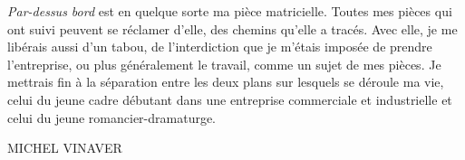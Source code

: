 \documentclass[a4paper]{report}
\begin{document}
\textit{Par-dessus bord} est en quelque sorte ma pièce matricielle. Toutes mes pièces qui ont suivi peuvent se réclamer d'elle, des chemins qu'elle a tracés. Avec elle, je me libérais aussi d'un tabou, de l'interdiction que je m'étais imposée de prendre l'entreprise, ou plus généralement le travail, comme un sujet de mes pièces. Je mettrais fin à la séparation entre les deux plans sur lesquels se déroule ma vie, celui du jeune cadre débutant dans une entreprise commerciale et industrielle et celui du jeune romancier-dramaturge.

\begin{flushright}
MICHEL VINAVER
\end{flushright}
\end{document}
